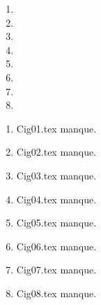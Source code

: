  
 
\begin{enumerate}
  \item  
  \item  
  \item  
  \item  
  \item  
  \item  
  \item  
  \item  
\end{enumerate} 
\clearpage 
{}
\begin{enumerate}
  \item Cig01.tex manque. 
  \item Cig02.tex manque. 
  \item Cig03.tex manque. 
  \item Cig04.tex manque. 
  \item Cig05.tex manque. 
  \item Cig06.tex manque. 
  \item Cig07.tex manque. 
  \item Cig08.tex manque. 
\end{enumerate} 
